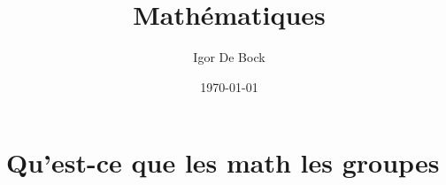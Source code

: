 \documentclass[a4paper]{article}
\author{Igor De Bock}
\date{\today}
\title{Mathématiques}
\begin{document}
    
    \section{Qu'est-ce que les math les groupes}

%



\end{document}
